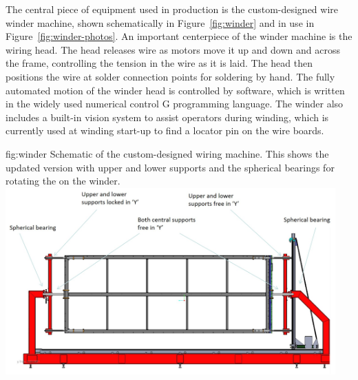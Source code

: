 The central piece of equipment used in  production is the custom-designed wire winder machine, shown schematically in Figure~\ref{fig:winder} and in use in Figure~\ref{fig:winder-photos}.  An important centerpiece of the winder machine is the wiring head.  The head releases wire as motors move it up and down and across the frame, controlling the tension in the wire as it is laid.  The head then positions the wire at solder connection points for soldering by hand. The fully automated motion of the winder head is controlled by software, which is written in the widely used numerical control G programming language.  The winder also includes a built-in vision system to assist operators during winding, which is currently used at winding start-up to find a locator pin on the wire boards.  

\begin{dunefigure}{fig:winder}
{Schematic of the custom-designed  wiring machine.  This shows the updated version with upper and lower supports and the spherical bearings for rotating the  on the winder.}
\includegraphics[width=0.95\textwidth]{graphics/sp-apa-winding-machine-design-development.jpg} 
\end{dunefigure}

